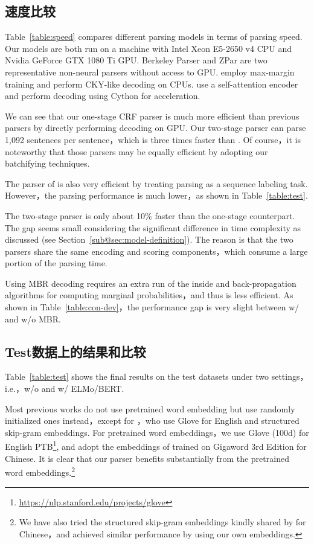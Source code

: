 \subsection{速度比较}
Table~\ref{table:speed} compares different parsing models in terms of parsing speed.
Our models are both run on a machine with Intel Xeon E5-2650 v4 CPU and Nvidia GeForce GTX 1080 Ti GPU.
Berkeley Parser and ZPar are two representative non-neural parsers without access to GPU.
\cite{stern-etal-2017-minimal} employ max-margin training and perform CKY-like decoding on CPUs.
\cite{kitaev-klein-2018-constituency} use a self-attention encoder and perform decoding using Cython for acceleration.


We can see that our one-stage CRF parser is much more efficient than previous parsers by directly performing decoding on GPU.
Our two-stage parser can parse 1,092 sentences per sentence，which is three times faster than \cite{kitaev-klein-2018-constituency}.
Of course，it is noteworthy that those parsers \cite{stern-etal-2017-minimal,kitaev-klein-2018-constituency} may be equally efficient by adopting our batchifying techniques.

The parser of \cite{gomez-rodriguez-vilares-2018-constituent} is also very efficient by treating parsing as a sequence labeling task. However，the parsing performance is much lower，as shown in Table~\ref{table:test}.

The two-stage parser is only about 10\% faster than the one-stage counterpart. The gap seems small considering the significant difference in time complexity as discussed (see Section~\ref{sub@sec:model-definition}).
The reason is that the two parsers share the same encoding and scoring components，which consume a large portion of the parsing time.

Using MBR decoding requires an extra run of the inside and back-propagation algorithms for computing marginal probabilities，and thus is less efficient.
As shown in Table~\ref{table:con-dev}，the performance gap is very slight between w/ and w/o MBR.

\subsection{Test数据上的结果和比较}
Table~\ref{table:test} shows the final results on the test datasets under two settings，i.e.，w/o and w/ ELMo/BERT.

Most previous works do not use pretrained word embedding but use randomly initialized ones instead，except for \cite{zhou-zhao-2019-head}，who use Glove for English and structured skip-gram embeddings.
For pretrained word embeddings，we use Glove (100d) %
for English PTB\footnote{\url{https://nlp.stanford.edu/projects/glove}},
and adopt the embeddings of \cite{li-etal-2019-attentive} trained on Gigaword 3rd Edition for Chinese.
It is clear that our parser benefits substantially from the pretrained word embeddings.\footnote{
    We have also tried the structured skip-gram embeddings kindly shared by \cite{zhou-zhao-2019-head} for Chinese，and achieved similar performance by using our own embeddings.
}


